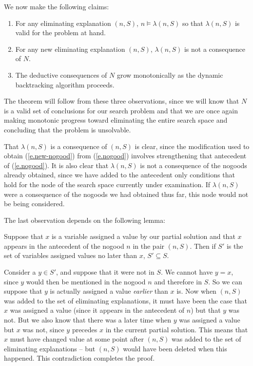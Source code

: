 We now make the following claims:
 \begin{enumerate}
 \item For any eliminating explanation $(n,S)$, $n\models
\lambda(n,S)$ so that $\lambda(n,S)$ is valid for the problem at hand.
 \item For any new eliminating explanation $(n,S)$, $\lambda(n,S)$ is
not a consequence of $N$.
 \item The deductive consequences of $N$ grow monotonically as the
dynamic backtracking algorithm proceeds.
 \end{enumerate}
 The theorem will follow from these three observations, since we will
know that $N$ is a valid set of conclusions for our search problem and
that we are once again making monotonic progress toward eliminating
the entire search space and concluding that the problem is unsolvable.

That $\lambda(n,S)$ is a consequence of $(n,S)$ is clear, since the
modification used to obtain (\ref{e.new-nogood}) from (\ref{e.nogood})
involves strengthening that antecedent of (\ref{e.nogood}).  It is
also clear that $\lambda(n,S)$ is not a consequence of the nogoods
already obtained, since we have added to the antecedent only
conditions that hold for the node of the search space currently under
examination.  If $\lambda(n,S)$ were a consequence of the nogoods we
had obtained thus far, this node would not be being considered.

The last observation depends on the following lemma:
 \begin{lemma} Suppose that $x$ is a variable assigned a value by our
partial solution and that $x$ appears in the antecedent of the nogood
$n$ in the pair $(n,S)$.  Then if $S'$ is the set of variables assigned
values no later than $x$, $S'\subseteq S$.
 \label{l.useful}
 \end{lemma}

\proof Consider a $y\in S'$, and suppose that it were not in $S$.  We
cannot have $y=x$, since $y$ would then be mentioned in the nogood $n$
and therefore in $S$.  So we can suppose that $y$ is actually assigned
a value {\em earlier\/} than $x$ is.  Now when $(n,S)$ was added to
the set of eliminating explanations, it must have been the case that
$x$ was assigned a value (since it appears in the antecedent of $n$)
but that $y$ was not.  But we also know that there was a later time
when $y$ was assigned a value but $x$ was not, since $y$ precedes $x$
in the current partial solution.  This means that $x$ must have
changed value at some point after $(n,S)$ was added to the set of
eliminating explanations -- but $(n,S)$ would have been deleted when
this happened.  This contradiction completes the proof.\proofend

